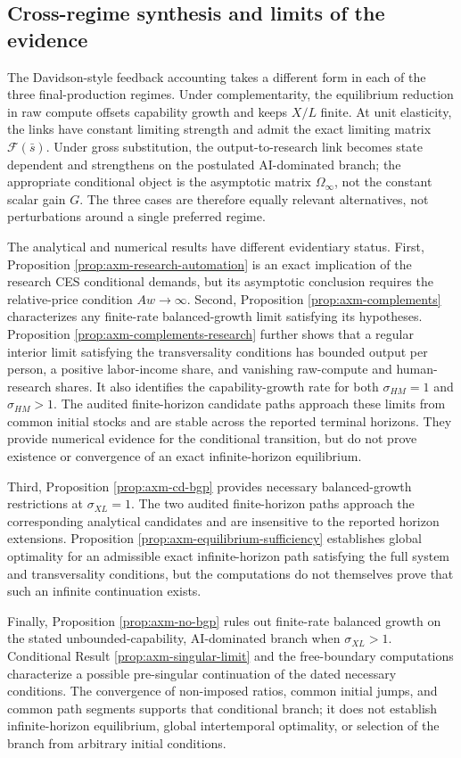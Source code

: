 \subsection{Cross-regime synthesis and limits of the evidence}

The Davidson-style feedback accounting takes a different form in each of the
three final-production regimes. Under complementarity, the equilibrium reduction
in raw compute offsets capability growth and keeps \(X/L\) finite. At unit
elasticity, the links have constant limiting strength and admit the exact limiting
matrix \(\mathcal F(\bar s)\). Under gross substitution, the output-to-research link
becomes state dependent and strengthens on the postulated AI-dominated branch;
the appropriate conditional object is the asymptotic
matrix \(\Omega_\infty\), not the constant scalar gain \(G\). The three cases are
therefore equally relevant alternatives, not perturbations around a single
preferred regime.

The analytical and numerical results have different evidentiary status. First,
Proposition \ref{prop:axm-research-automation} is an exact implication of the
research CES conditional demands, but its asymptotic conclusion requires the
relative-price condition \(Aw\to\infty\). Second, Proposition
\ref{prop:axm-complements} characterizes any finite-rate balanced-growth limit
satisfying its hypotheses. Proposition \ref{prop:axm-complements-research} further
shows that a regular interior limit satisfying the transversality conditions has
bounded output per person, a positive labor-income share, and vanishing raw-compute
and human-research shares. It also identifies the capability-growth rate for
both \(\sigma_{HM}=1\) and \(\sigma_{HM}>1\). The audited finite-horizon
candidate paths approach these limits from common initial stocks and are stable
across the reported terminal horizons. They provide numerical evidence for the
conditional transition, but do not prove existence or convergence of an exact
infinite-horizon equilibrium.

Third, Proposition \ref{prop:axm-cd-bgp} provides necessary balanced-growth
restrictions at \(\sigma_{XL}=1\). The two audited finite-horizon paths approach
the corresponding analytical candidates and are insensitive to the reported
horizon extensions. Proposition \ref{prop:axm-equilibrium-sufficiency} establishes
global optimality for an admissible exact infinite-horizon path satisfying the
full system and transversality conditions, but the computations do not themselves
prove that such an infinite continuation exists.

Finally, Proposition \ref{prop:axm-no-bgp} rules out finite-rate balanced growth
on the stated unbounded-capability, AI-dominated branch when
\(\sigma_{XL}>1\). Conditional Result \ref{prop:axm-singular-limit} and the
free-boundary computations characterize a possible pre-singular continuation of
the dated necessary conditions. The convergence of non-imposed ratios, common
initial jumps, and common path segments supports that conditional branch; it does
not establish infinite-horizon equilibrium, global intertemporal optimality, or
selection of the branch from arbitrary initial conditions.
